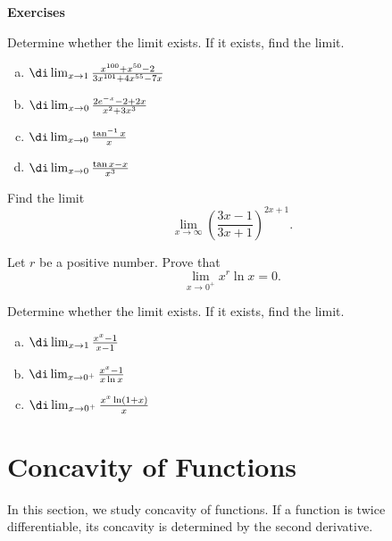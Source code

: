 \begin{example}{}
\vp
\noindent
{\bf \large Exercises  \thesection}
\setcounter{myquestion}{1}

\begin{question}{\themyquestion}
Determine whether the limit exists. If it exists, find the limit.
\begin{enumerate}[(a)]
\item
$\di\lim_{x\to 1}\frac{x^{100}+x^{50}-2}{3x^{101}+4x^{55}-7x}$
\item $\di \lim_{x\to 0}\frac{2e^{-x}-2+2x}{x^2+3x^3}$
\item $\di\lim_{x\to 0}\frac{\tan^{-1}x}{x}$
\item $\di\lim_{x\to 0}\frac{\tan x-x}{x^3}$
\end{enumerate}
\end{question}
\atc
\begin{question}{\themyquestion}
Find the limit
\[\lim_{x\to \infty}\left(\frac{3x-1}{3x+1}\right)^{2x+1}.\]
\end{question}
\atc
\begin{question}{\themyquestion}
Let $r$ be a positive number. Prove that
\[\lim_{x\to 0^+}x^r\ln x=0.\]
\end{question}

 
\atc
\begin{question}{\themyquestion}
Determine whether the limit
 exists. If it exists, find the limit.
\begin{enumerate}[(a)]
\item
$\di \lim_{x\to 1}\frac{x^x-1}{x-1}$
\item $\di \lim_{x\to 0^+}\frac{x^x-1}{x\ln x}$
\item $\di \lim_{x\to 0^+}\frac{x^x\ln (1+x)}{x}$
\end{enumerate}
\end{question}


\vp

\section{Concavity of Functions}\label{sec3.7}

In this section, we study concavity of functions. If a function is twice differentiable, its concavity is determined by the second derivative.


\end{example}
